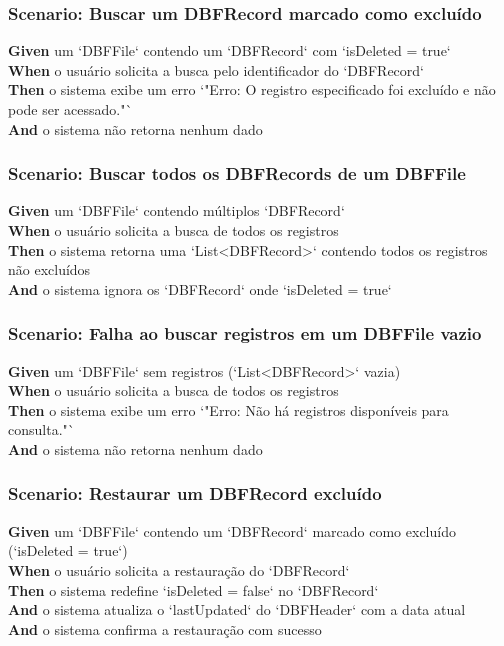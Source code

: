 \subsubsection{Scenario: Buscar um DBFRecord marcado como excluído}
\textbf{Given} um `DBFFile` contendo um `DBFRecord` com `isDeleted = true` \\
\textbf{When} o usuário solicita a busca pelo identificador do `DBFRecord` \\
\textbf{Then} o sistema exibe um erro `"Erro: O registro especificado foi excluído e não pode ser acessado."` \\
\textbf{And} o sistema não retorna nenhum dado

\subsubsection{Scenario: Buscar todos os DBFRecords de um DBFFile}
\textbf{Given} um `DBFFile` contendo múltiplos `DBFRecord` \\
\textbf{When} o usuário solicita a busca de todos os registros \\
\textbf{Then} o sistema retorna uma `List<DBFRecord>` contendo todos os registros não excluídos \\
\textbf{And} o sistema ignora os `DBFRecord` onde `isDeleted = true`

\subsubsection{Scenario: Falha ao buscar registros em um DBFFile vazio}
\textbf{Given} um `DBFFile` sem registros (`List<DBFRecord>` vazia) \\
\textbf{When} o usuário solicita a busca de todos os registros \\
\textbf{Then} o sistema exibe um erro `"Erro: Não há registros disponíveis para consulta."` \\
\textbf{And} o sistema não retorna nenhum dado

\subsubsection{Scenario: Restaurar um DBFRecord excluído}
\textbf{Given} um `DBFFile` contendo um `DBFRecord` marcado como excluído (`isDeleted = true`) \\
\textbf{When} o usuário solicita a restauração do `DBFRecord` \\
\textbf{Then} o sistema redefine `isDeleted = false` no `DBFRecord` \\
\textbf{And} o sistema atualiza o `lastUpdated` do `DBFHeader` com a data atual \\
\textbf{And} o sistema confirma a restauração com sucesso

